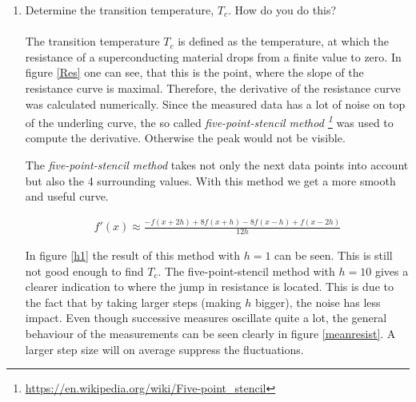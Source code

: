 \documentclass[a4paper,parskip,11pt, DIV12]{scrreprt}
\begin{document}
\begin{enumerate}
\hspace{0.1pt}

\item Determine the transition temperature, $T_c$. How do you do this?\\
\\
The transition temperature $T_c$ is defined as the temperature, at which the resistance of a superconducting material drops from a finite value to zero. In figure \ref{Res} one can see, that this is the point, where the slope of the resistance curve is maximal. Therefore, the derivative of the resistance curve was calculated numerically. Since the measured data has a lot of noise on top of the underling curve, the so called \emph{five-point-stencil method \footnote{\url{https://en.wikipedia.org/wiki/Five-point_stencil}}} was used to compute the derivative. Otherwise the peak would not be visible.

The \emph{five-point-stencil method} takes not only the next data points into account but also the 4 surrounding values. With this method we get a more smooth and useful curve. 

\begin{align*}
f'(x) \approx \frac{-f(x+2 h)+8 f(x+h)-8 f(x-h)+f(x-2h)}{12 h}
\end{align*}

In figure \ref{h1} the result of this method with $h = 1$ can be seen. This is still not good enough to find $T_c$. The five-point-stencil method with $h = 10$ gives a clearer indication to where the jump in resistance is located. This is due to the fact that by taking larger steps (making $h$ bigger), the noise has less impact. Even though successive measures oscillate quite a lot, the general behaviour of the measurements can be seen clearly in figure \ref{meanresist}. A larger step size will on average suppress the fluctuations.


\end{enumerate}
\end{document}
